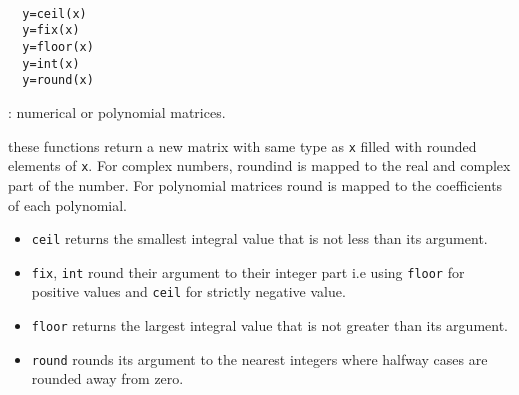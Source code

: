 \begin{mandesc} 
   \\
  \\
   \\
\end{mandesc}
\begin{calling_sequence}
\begin{verbatim}
  y=ceil(x)  
  y=fix(x)  
  y=floor(x)  
  y=int(x)  
  y=round(x)  
\end{verbatim}
\end{calling_sequence}
\begin{parameters}
  \begin{varlist}
    : numerical or polynomial matrices.
  \end{varlist}
\end{parameters}
\begin{mandescription}
  these functions return a new matrix with same type as \verb!x! filled 
  with rounded elements of \verb!x!. For complex numbers, roundind is mapped to the 
  real and complex part of the number. For polynomial matrices round is 
  mapped to the  coefficients of each polynomial.
  \begin{itemize}
  \item \verb!ceil! returns the smallest integral value that is not less than its
    argument.
  \item \verb!fix!, \verb!int! round their argument to their integer part i.e using \verb!floor! for 
    positive values and \verb!ceil! for strictly negative value.
  \item \verb!floor! returns the largest integral value that is not greater than
    its argument.
  \item \verb!round! rounds its argument to the nearest integers where halfway cases are rounded
    away from zero.
  \end{itemize}
\end{mandescription}
    
